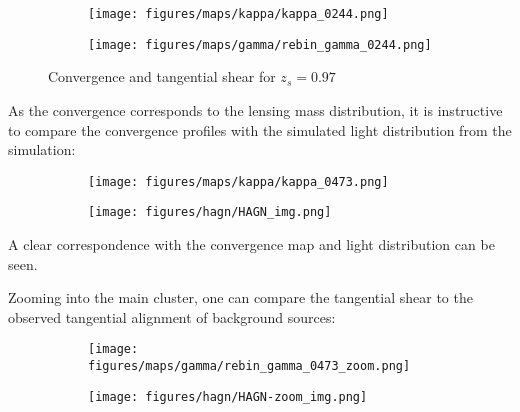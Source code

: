 \documentclass{beamer}
\begin{document}
  \begin{frame}
    \begin{figure}[H]
      \centering
      \begin{subfigure}{0.49\textwidth}
        \texttt{[image: figures/maps/kappa/kappa\_0244.png]}
      \end{subfigure}
      \hfill
      \begin{subfigure}{0.49\textwidth}
        \texttt{[image: figures/maps/gamma/rebin\_gamma\_0244.png]}
      \end{subfigure}
      \hfill
      \caption{Convergence and tangential shear for $z_s = 0.97$}
      \label{fig:0244 kappa gamma}
    \end{figure}
  \end{frame}

  \begin{frame}
    As the convergence corresponds to the lensing mass distribution, it is instructive to compare the convergence profiles with the simulated light distribution from the simulation:

    \begin{figure}[H]
      \begin{subfigure}{0.49\textwidth}
        \texttt{[image: figures/maps/kappa/kappa\_0473.png]}
      \end{subfigure}
      \hfill
      \begin{subfigure}{0.35\textwidth}
        \texttt{[image: figures/hagn/HAGN\_img.png]}
      \end{subfigure}
      \hfill
    \end{figure}

    A clear correspondence with the convergence map and light distribution can be seen.
  \end{frame}

  \begin{frame}
    Zooming into the main cluster, one can compare the tangential shear to the observed tangential alignment of background sources:

    \begin{figure}[H]
      \begin{subfigure}{0.49\textwidth}
        \texttt{[image: figures/maps/gamma/rebin\_gamma\_0473\_zoom.png]}
      \end{subfigure}
      \hfill
      \begin{subfigure}{0.35\textwidth}
        \texttt{[image: figures/hagn/HAGN-zoom\_img.png]}
      \end{subfigure}
      \hfill
    \end{figure}
  \end{frame}
\end{document}
